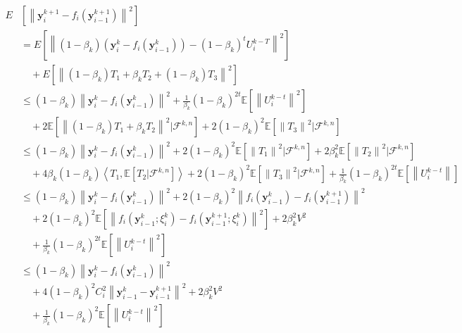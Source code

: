 \begin{equation*}
\begin{split}
E&\left [ \left \| \boldsymbol{y}_i^{k+1}-f_i\left ( \boldsymbol{y}_{i-1}^{k+1} \right )\right \|^2 \right ]\\
&=E\left [ \left \| \left ( 1-\beta_k \right )\left ( \boldsymbol{y}_i^k-f_i\left ( \boldsymbol{y}_{i-1}^k \right ) \right )-\left ( 1-\beta_k \right )^tU_i^{k-T} \right \|^2 \right ]\\
&\quad+E\left [ \left \| \left ( 1-\beta_k \right )T_1+\beta_kT_2+\left ( 1-\beta_k \right )T_3 \right \|^2 \right ]\\
&\leq\left ( 1-\beta_k \right )\left \| \boldsymbol{y}_i^k-f_i\left ( \boldsymbol{y}_{i-1}^k \right ) \right \|^2+\frac{1}{\beta_k}\left ( 1-\beta_k \right )^{2t}\mathbb{E}\left [ \left \| U_i^{k-t} \right \|^2 \right ]\\
&\quad+2\mathbb{E}\left [ \left \| \left ( 1-\beta_k \right )T_1+\beta_kT_2 \right \|^2|\mathcal{F}^{k,n} \right ]+2\left ( 1-\beta_k \right )^2\mathbb{E}\left [ \left \| T_3 \right \|^2|\mathcal{F}^{k,n} \right ]\\
&\leq\left ( 1-\beta_k \right )\left \| \boldsymbol{y}_i^k-f_i\left ( \boldsymbol{y}_{i-1}^k \right ) \right \|^2+2\left ( 1-\beta_k \right )^2\mathbb{E}\left [ \left \| T_1 \right \|^2|\mathcal{F}^{k,n} \right ]+2\beta_k^2\mathbb{E}\left [ \left \| T_2 \right \|^2|\mathcal{F}^{k,n} \right ]\\
&\quad+4\beta_k\left ( 1-\beta_k \right )\left \langle T_1,\mathbb{E}\left [ T_2|\mathcal{F}^{k,n} \right ] \right \rangle+2\left ( 1-\beta_k \right )^2\mathbb{E}\left [ \left \| T_3 \right \|^2|\mathcal{F}^{k,n} \right ]+\frac{1}{\beta_k}\left ( 1-\beta_k \right )^{2t}\mathbb{E}\left [ \left \| U_i^{k-t} \right \| \right ]\\
&\leq\left ( 1-\beta_k \right )\left \| \boldsymbol{y}_i^k-f_i\left ( \boldsymbol{y}_{i-1}^k \right ) \right \|^2+2\left ( 1-\beta_k \right )^2\left \| f_i\left ( \boldsymbol{y}_{i-1}^k \right )-f_i\left ( \boldsymbol{y}_{i-1}^{k+1} \right ) \right \|^2\\
&\quad+2\left ( 1-\beta_k \right )^2\mathbb{E}\left [ \left \| f_i\left ( \boldsymbol{y}_{i-1}^k;\xi_i^k \right )-f_i\left ( \boldsymbol{y}_{i-1}^{k+1};\xi_i^k \right ) \right \|^2 \right ]+2\beta_k^2V^2\\
&\quad+\frac{1}{\beta_k}\left ( 1-\beta_k \right )^{2t}\mathbb{E}\left [ \left \| U_i^{k-t} \right \|^2 \right ]\\
&\leq\left ( 1-\beta_k \right )\left \| \boldsymbol{y}_i^k-f_i\left ( \boldsymbol{y}_{i-1}^k \right ) \right \|^2\\
&\quad+4\left ( 1-\beta_k \right )^2C_i^2\left \| \boldsymbol{y}_{i-1}^k-\boldsymbol{y}_{i-1}^{k+1} \right \|^2+2\beta_k^2V^2\\
&\quad+\frac{1}{\beta_k}\left( 1-\beta_k \right )^2\mathbb{E}\left [ \left \| U_i^{k-t} \right \|^2 \right ]
\end{split}
\end{equation*}

